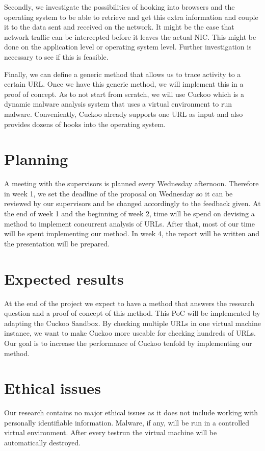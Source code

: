 \documentclass{scrartcl}
\begin{document}
Secondly, we investigate the possibilities of hooking into browsers and the operating system to be able to retrieve and get this extra information and couple it to the data sent and received on the network. It might be the case that network traffic can be intercepted before it leaves the actual NIC. This might be done on the application level or operating system level. Further investigation is necessary to see if this is feasible.

Finally, we can define a generic method that allows us to trace activity to a certain URL. Once we have this generic method, we will implement this in a proof of concept. As to not start from scratch, we will use Cuckoo which is a dynamic malware analysis system that uses a virtual environment to run malware. Conveniently, Cuckoo already supports one URL as input and also provides dozens of hooks into the operating system. 

\section{Planning}

A meeting with the supervisors is planned every Wednesday afternoon. Therefore in week 1, we set the deadline of the proposal on Wednesday so it can be reviewed by our supervisors and be changed accordingly to the feedback given. At the end of week 1 and the beginning of week 2, time will be spend on devising a method to implement concurrent analysis of URLs. After that, most of our time will be spent implementing our method. In week 4, the report will be written and the presentation will be prepared.

\section{Expected results}

At the end of the project we expect to have a method that answers the research question and a proof of concept of this method. This PoC will be implemented by adapting the Cuckoo Sandbox. By checking multiple URLs in one virtual machine instance, we want to make Cuckoo more useable for checking hundreds of URLs. Our goal is to increase the performance of Cuckoo tenfold by implementing our method.

\section{Ethical issues}

Our research contains no major ethical issues as it does not include working with personally identifiable information. Malware, if any, will be run in a controlled virtual environment. After every testrun the virtual machine will be automatically destroyed.



\end{document}
